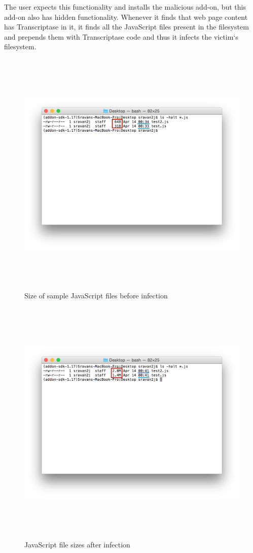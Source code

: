 The user expects this functionality and installs the malicious add-on, but this add-on also has hidden functionality. Whenever it finds that web page content has Transcriptase in it, it finds all the JavaScript files present in the filesystem and prepends them with Transcriptase code and thus it infects the victim`s filesystem. 

\begin{figure}
    \centering    
    \includegraphics[width=17cm, height=11.95cm]{beforeinf.png}
    \caption[Size of sample JavaScript files before infection, ]{Size of sample JavaScript files before infection}
    \label{fig:beforeinf}
\end{figure}
\begin{figure}
    \centering    
    \includegraphics[width=17cm, height=11.95cm]{afterinf.png}
    \caption[JavaScript file sizes after infection]{JavaScript file sizes after infection}
    \label{fig:afterinf}
\end{figure}

